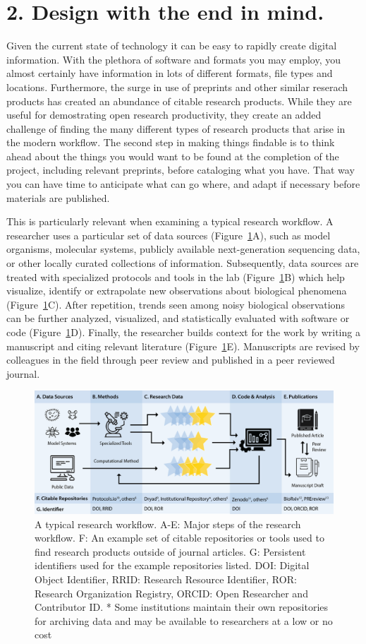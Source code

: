 \documentclass[10pt,letterpaper]{article}
\newcommand{\rulemajor}[1]{\section*{#1}}
\begin{document}
\rulemajor{2. Design with the end in mind.}

Given the current state of technology it can be easy to rapidly create digital
information. With the plethora of software and formats you may employ, you
almost certainly have information in lots of different formats, file types and
locations. Furthermore, the surge in use of preprints and other similar reserach 
products has created an abundance of citable research products. While they are useful
for demostrating open research productivity, they create an added challenge of finding 
the many different types of research products that arise in the modern workflow.
The second step in making things findable is to think ahead about
the things you would want to be found at the completion of the project, including
relevant preprints, before cataloging what you have. That way you can have time to 
anticipate what can go where, and adapt if necessary before materials are published.

This is particularly relevant when examining a typical research workflow. A
researcher uses a particular set of data sources (Figure~\ref{workflow}A), such
as model organisms, molecular systems, publicly available next-generation
sequencing data, or other locally curated collections of information.
Subsequently, data sources are treated with specialized protocols and tools in
the lab (Figure~\ref{workflow}B) which help visualize, identify or extrapolate
new observations about biological phenomena (Figure~\ref{workflow}C). After
repetition, trends seen among noisy biological observations can be further
analyzed, visualized, and statistically evaluated with software or code
(Figure~\ref{workflow}D). Finally, the researcher builds context for the work by
writing a manuscript and citing relevant literature (Figure~\ref{workflow}E).
Manuscripts are revised by colleagues in the field through peer review
and published in a peer reviewed journal.

\begin{figure}
  \includegraphics[width=\textwidth]{workflow.png}
  \captionsetup{justification=centering}
  \caption{A typical research workflow. A-E: Major steps of the research workflow.
  F: An example set of citable repositories or tools used to find research products 
  outside of journal articles. G: Persistent identifiers used
  for the example repositories listed. DOI: Digital Object Identifier, RRID: Research
  Resource Identifier, ROR: Research Organization Registry, ORCID: Open Researcher and 
  Contributor ID. * Some institutions maintain their own repositories for archiving data
  and may be available to researchers at a low or no cost}
  \label{workflow}
\end{figure}
\end{document}
